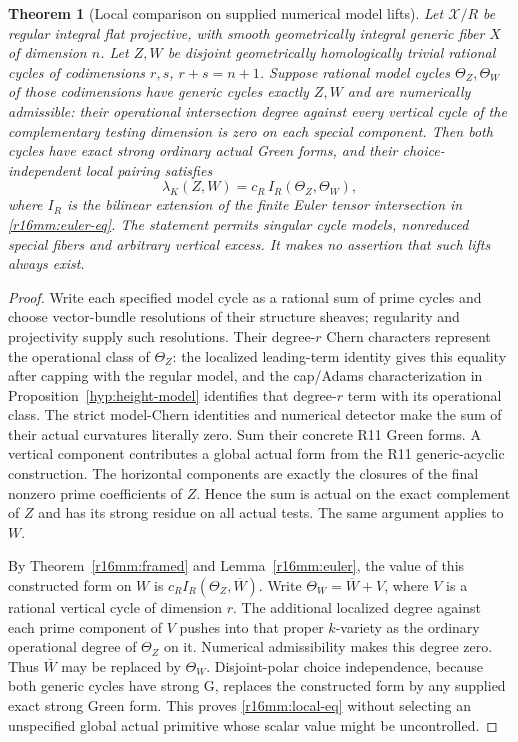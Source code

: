 \documentclass[11pt,a4paper]{article}
\newtheorem{theorem}{Theorem}[section]
\theoremstyle{definition}
\theoremstyle{remark}
\numberwithin{equation}{section}
\begin{document}
\begin{theorem}[Local comparison on supplied numerical model lifts]
\label{r16mm:local}
Let $\mathcal X/R$ be regular integral flat projective, with
smooth geometrically integral generic fiber $X$ of dimension
$n$. Let $Z,W$ be disjoint geometrically homologically trivial
rational cycles of codimensions $r,s$, $r+s=n+1$.
Suppose rational model cycles $\Theta_Z,\Theta_W$ of those
codimensions have generic cycles exactly $Z,W$ and are
numerically admissible: their operational intersection degree
against every vertical cycle of the complementary testing
dimension is zero on each special component. Then both cycles
have exact strong ordinary actual Green forms, and their
choice-independent local pairing satisfies
\[
 \lambda_K(Z,W)=c_R\,I_R(\Theta_Z,\Theta_W),
 \tag{MM16.9}\label{r16mm:local-eq}
\]
where $I_R$ is the bilinear extension of the finite Euler tensor
intersection in \eqref{r16mm:euler-eq}. The statement permits
singular cycle models, nonreduced special fibers and arbitrary
vertical excess. It makes no assertion that such lifts always
exist.
\end{theorem}

\begin{proof}
Write each specified model cycle as a rational sum of prime
cycles and choose vector-bundle resolutions of their structure
sheaves; regularity and projectivity supply such resolutions.
Their degree-$r$ Chern characters represent the operational
class of $\Theta_Z$: the localized leading-term identity gives
this equality after capping with the regular model, and the
cap/Adams characterization in Proposition~\ref{hyp:height-model} identifies that degree-$r$ term
with its operational class. The strict model-Chern identities and
numerical detector make the sum of their actual curvatures
literally zero. Sum their concrete R11 Green forms. A vertical
component contributes a global actual form from the R11
generic-acyclic construction. The horizontal components are
exactly the closures of the final nonzero prime coefficients
of $Z$. Hence the sum is actual on the exact complement of
$Z$ and has its strong residue on all actual tests. The same
argument applies to $W$.

By Theorem~\ref{r16mm:framed} and Lemma~\ref{r16mm:euler},
the value of this constructed form on $W$ is
$c_R I_R(\Theta_Z,\overline W)$.
Write $\Theta_W=\overline W+V$, where $V$ is a rational
vertical cycle of dimension $r$. The additional localized
degree against each prime component of $V$ pushes into that
proper $k$-variety as the ordinary operational degree of
$\Theta_Z$ on it. Numerical admissibility makes this degree
zero. Thus $\overline W$ may be replaced by $\Theta_W$.
Disjoint-polar choice independence, because both
generic cycles have strong G, replaces the constructed form
by any supplied exact strong Green form. This proves
\eqref{r16mm:local-eq} without selecting an unspecified global
actual primitive whose scalar value might be uncontrolled.
\end{proof}
\end{document}
